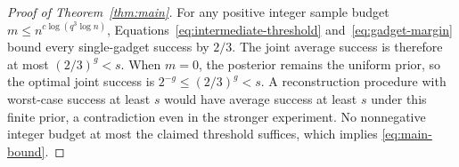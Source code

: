 \begin{proof}[Proof of Theorem~\ref{thm:main}]
For any positive integer sample budget $m\le n^{c\log(q^3\log n)}$, Equations~\eqref{eq:intermediate-threshold} and~\eqref{eq:gadget-margin} bound every single-gadget success by $2/3$.  The joint average success is therefore at most $(2/3)^g<s$.  When $m=0$, the posterior remains the uniform prior, so the optimal joint success is $2^{-g}\le(2/3)^g<s$.  A reconstruction procedure with worst-case success at least $s$ would have average success at least $s$ under this finite prior, a contradiction even in the stronger experiment.  No nonnegative integer budget at most the claimed threshold suffices, which implies \eqref{eq:main-bound}.
\end{proof}
